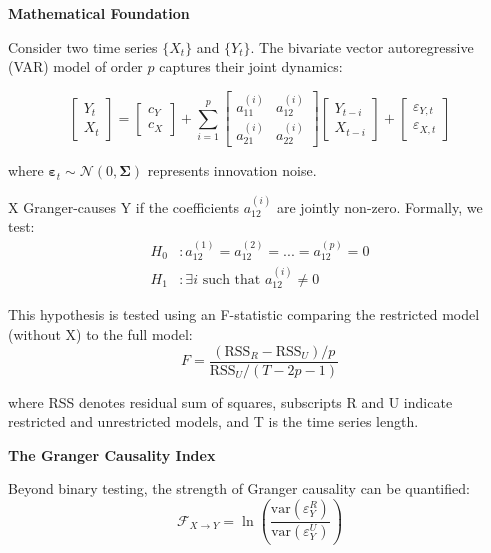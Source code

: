 \textbf{Mathematical Foundation}

Consider two time series $\{X_t\}$ and $\{Y_t\}$. The bivariate vector autoregressive (VAR) model of order $p$ captures their joint dynamics:

\begin{equation}
\begin{bmatrix} Y_t \\ X_t \end{bmatrix} = \begin{bmatrix} c_Y \\ c_X \end{bmatrix} + \sum_{i=1}^{p} \begin{bmatrix} a_{11}^{(i)} & a_{12}^{(i)} \\ a_{21}^{(i)} & a_{22}^{(i)} \end{bmatrix} \begin{bmatrix} Y_{t-i} \\ X_{t-i} \end{bmatrix} + \begin{bmatrix} \varepsilon_{Y,t} \\ \varepsilon_{X,t} \end{bmatrix}
\end{equation}

where $\boldsymbol{\varepsilon}_t \sim \mathcal{N}(0, \boldsymbol{\Sigma})$ represents innovation noise.

X Granger-causes Y if the coefficients $a_{12}^{(i)}$ are jointly non-zero. Formally, we test:
\begin{align}
H_0&: a_{12}^{(1)} = a_{12}^{(2)} = ... = a_{12}^{(p)} = 0 \\
H_1&: \exists i \text{ such that } a_{12}^{(i)} \neq 0
\end{align}

This hypothesis is tested using an F-statistic comparing the restricted model (without X) to the full model:
\begin{equation}
F = \frac{(\text{RSS}_R - \text{RSS}_U)/p}{\text{RSS}_U/(T-2p-1)}
\end{equation}

where RSS denotes residual sum of squares, subscripts R and U indicate restricted and unrestricted models, and T is the time series length.

\textbf{The Granger Causality Index}

Beyond binary testing, the strength of Granger causality can be quantified:
\begin{equation}
\mathcal{F}_{X \rightarrow Y} = \ln\left(\frac{\text{var}(\varepsilon_Y^R)}{\text{var}(\varepsilon_Y^U)}\right)
\end{equation}

